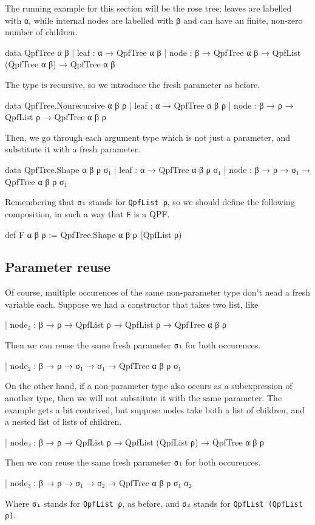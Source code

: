 \documentclass[titlepage]{report}
\begin{document}
The running example for this section will be the rose tree; leaves are labelled with \texttt{α}, while
internal nodes are labelled with \texttt{β} and can have an finite, non-zero number of children.
\begin{leancode}
    data QpfTree α β
      | leaf : α → QpfTree α β
      | node : β → QpfTree α β → QpfList (QpfTree α β) → QpfTree α β
\end{leancode}

The type is recursive, so we introduce the fresh parameter as before.
\begin{leancode}
    data QpfTree.Nonrecursive α β ρ
      | leaf : α → QpfTree α β ρ
      | node : β → ρ → QpfList ρ → QpfTree α β ρ
\end{leancode}

Then, we go through each argument type which is not just a parameter, and substitute
it with a fresh parameter.

\begin{leancode}
    data QpfTree.Shape α β ρ σ₁
      | leaf : α → QpfTree α β ρ σ₁
      | node : β → ρ → σ₁ → QpfTree α β ρ σ₁
\end{leancode}
Remembering that \texttt{σ₁} stands for \texttt{QpfList ρ}, so we should define the following 
composition, in such a way that \texttt{F} is a QPF.
\begin{leancode}
    def F α β ρ := QpfTree.Shape α β ρ (QpfList ρ)
\end{leancode}


\subsection{Parameter reuse}
Of course, multiple occurences of the same non-parameter type don't nead a fresh variable each.
Suppose we had a constructor that takes two list, like
\begin{leancode}
    | node₂ : β → ρ → QpfList ρ → QpfList ρ → QpfTree α β ρ
\end{leancode}
Then we can reuse the same fresh parameter \texttt{σ₁} for both occurences.
\begin{leancode}
    | node₂ : β → ρ → σ₁ → σ₁ → QpfTree α β ρ σ₁
\end{leancode}

On the other hand, if a non-parameter type also occurs as a subexpression of another type, then
we will not substitute it with the same parameter.
The example gets a bit contrived, but suppose nodes take both a list of children, and a nested list 
of lists of children.
\begin{leancode}
    | node₃ : β → ρ → QpfList ρ → QpfList (QpfList ρ) → QpfTree α β ρ
\end{leancode}
Then we can reuse the same fresh parameter \texttt{σ₁} for both occurences.
\begin{leancode}
    | node₃ : β → ρ → σ₁ → σ₂ → QpfTree α β ρ σ₁ σ₂
\end{leancode}
Where \texttt{σ₁} stands for \texttt{QpfList ρ}, as before, and \texttt{σ₂} stands for 
\texttt{QpfList (QpfList ρ)}.
\end{document}
